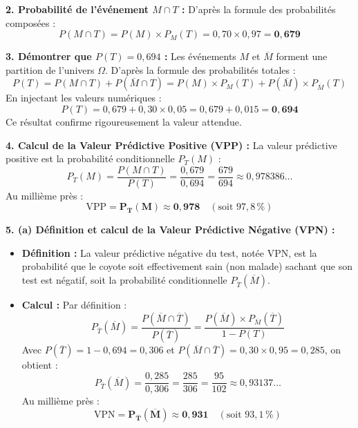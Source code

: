 \documentclass[11pt,a4paper]{article}
\begin{document}
\begin{correctionbox}
\textbf{2. Probabilité de l'événement $M \cap T$ :}
D'après la formule des probabilités composées :
\[
P(M \cap T) = P(M) \times P_M(T) = 0{,}70 \times 0{,}97 = \mathbf{0{,}679}
\]

\textbf{3. Démontrer que $P(T) = 0{,}694$ :}
Les événements $M$ et $\overline{M}$ forment une partition de l'univers $\Omega$. D'après la formule des probabilités totales :
\[
P(T) = P(M \cap T) + P(\overline{M} \cap T) = P(M) \times P_M(T) + P(\overline{M}) \times P_{\overline{M}}(T)
\]
En injectant les valeurs numériques :
\[
P(T) = 0{,}679 + 0{,}30 \times 0{,}05 = 0{,}679 + 0{,}015 = \mathbf{0{,}694}
\]
Ce résultat confirme rigoureusement la valeur attendue.

\textbf{4. Calcul de la Valeur Prédictive Positive (VPP) :}
La valeur prédictive positive est la probabilité conditionnelle $P_T(M)$ :
\[
P_T(M) = \frac{P(M \cap T)}{P(T)} = \frac{0{,}679}{0{,}694} = \frac{679}{694} \approx 0{,}978386\dots
\]
Au millième près :
\[
\mathbf{\mathrm{VPP} = P_T(M) \approx 0{,}978} \quad (\text{soit } 97{,}8\,\%)
\]

\textbf{5. (a) Définition et calcul de la Valeur Prédictive Négative (VPN) :}
\begin{itemize}[label=$\bullet$]
    \item \textbf{Définition :} La valeur prédictive négative du test, notée $\mathrm{VPN}$, est la probabilité que le coyote soit effectivement sain (non malade) sachant que son test est négatif, soit la probabilité conditionnelle $P_{\overline{T}}(\overline{M})$.
    \item \textbf{Calcul :} Par définition :
    \[
    P_{\overline{T}}(\overline{M}) = \frac{P(\overline{M} \cap \overline{T})}{P(\overline{T})} = \frac{P(\overline{M}) \times P_{\overline{M}}(\overline{T})}{1 - P(T)}
    \]
    Avec $P(\overline{T}) = 1 - 0{,}694 = 0{,}306$ et $P(\overline{M} \cap \overline{T}) = 0{,}30 \times 0{,}95 = 0{,}285$, on obtient :
    \[
    P_{\overline{T}}(\overline{M}) = \frac{0{,}285}{0{,}306} = \frac{285}{306} = \frac{95}{102} \approx 0{,}93137\dots
    \]
    Au millième près :
    \[
    \mathbf{\mathrm{VPN} = P_{\overline{T}}(\overline{M}) \approx 0{,}931} \quad (\text{soit } 93{,}1\,\%)
    \]
\end{itemize}


\end{correctionbox}
\end{document}
